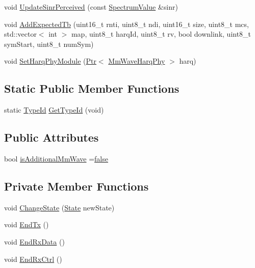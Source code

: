 \begin{DoxyCompactItemize}
\item 
void \hyperlink{classns3_1_1MmWaveSpectrumPhy_ad00477c4185055c7fb2b717bb42fd668}{Update\+Sinr\+Perceived} (const \hyperlink{classns3_1_1SpectrumValue}{Spectrum\+Value} \&sinr)
\item 
void \hyperlink{classns3_1_1MmWaveSpectrumPhy_a826c9174ef9c0330d894ca7f687d4d44}{Add\+Expected\+Tb} (uint16\+\_\+t rnti, uint8\+\_\+t ndi, uint16\+\_\+t size, uint8\+\_\+t mcs, std\+::vector$<$ int $>$ map, uint8\+\_\+t harq\+Id, uint8\+\_\+t rv, bool downlink, uint8\+\_\+t sym\+Start, uint8\+\_\+t num\+Sym)
\item 
void \hyperlink{classns3_1_1MmWaveSpectrumPhy_a556b3c0912ab795614289c32d191f6e7}{Set\+Harq\+Phy\+Module} (\hyperlink{classns3_1_1Ptr}{Ptr}$<$ \hyperlink{classns3_1_1MmWaveHarqPhy}{Mm\+Wave\+Harq\+Phy} $>$ harq)
\end{DoxyCompactItemize}
\subsection*{Static Public Member Functions}
\begin{DoxyCompactItemize}
\item 
static \hyperlink{classns3_1_1TypeId}{Type\+Id} \hyperlink{classns3_1_1MmWaveSpectrumPhy_abdfa2e96a4af7b8067be1343c2939ca4}{Get\+Type\+Id} (void)
\end{DoxyCompactItemize}
\subsection*{Public Attributes}
\begin{DoxyCompactItemize}
\item 
bool \hyperlink{classns3_1_1MmWaveSpectrumPhy_a424e1d78317df52f798d7dee04f4c096}{is\+Additional\+Mm\+Wave} =\hyperlink{lte__cqi__generation_8m_ab1bef239d413c4da139c4bac92cd657a}{false}
\end{DoxyCompactItemize}
\subsection*{Private Member Functions}
\begin{DoxyCompactItemize}
\item 
void \hyperlink{classns3_1_1MmWaveSpectrumPhy_a9cd75564fa85ffcb96771d0f5451d3e5}{Change\+State} (\hyperlink{classns3_1_1MmWaveSpectrumPhy_a665335f60416cf031a9b68209e4368ae}{State} new\+State)
\item 
void \hyperlink{classns3_1_1MmWaveSpectrumPhy_a7874f6ea88d4ea9bcef503e5d55e3e59}{End\+Tx} ()
\item 
void \hyperlink{classns3_1_1MmWaveSpectrumPhy_abc84ca909d7e225a7f31d8e88bb20865}{End\+Rx\+Data} ()
\item 
void \hyperlink{classns3_1_1MmWaveSpectrumPhy_a20f81391ed608749f0edd4217189955b}{End\+Rx\+Ctrl} ()
\end{DoxyCompactItemize}

